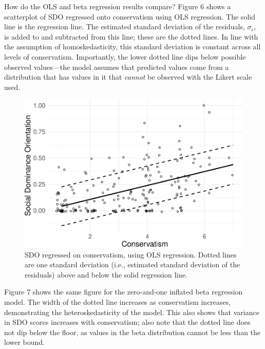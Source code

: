 \documentclass[english,,man]{apa6}
\begin{document}
How do the OLS and beta regression results compare? Figure 6 shows a scatterplot of SDO regressed onto conservatism using OLS regression. The solid line is the regression line. The estimated standard deviation of the residuals, \(\sigma_\epsilon\), is added to and subtracted from this line; these are the dotted lines. In line with the assumption of homoskedasticity, this standard deviation is constant across all levels of conservatism. Importantly, the lower dotted line dips below possible observed values---the model assumes that predicted values come from a distribution that has values in it that \emph{cannot} be observed with the Likert scale used.

\begin{figure}
\centering
\includegraphics{beta_hurdle_files/figure-latex/unnamed-chunk-18-1.pdf}
\caption{\label{fig:unnamed-chunk-18}SDO regressed on conservatism, using OLS regression. Dotted lines are one standard deviation (i.e., estimated standard deviation of the residuals) above and below the solid regression line.}
\end{figure}

Figure 7 shows the same figure for the zero-and-one inflated beta regression model. The width of the dotted line increases as conservatism increases, demonstrating the heteroskedasticity of the model. This also shows that variance in SDO scores increases with conservatism; also note that the dotted line does not dip below the floor, as values in the beta distribution cannot be less than the lower bound.
\end{document}

